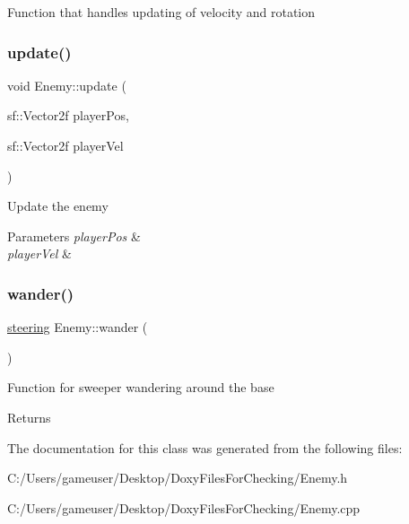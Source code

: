 Function that handles updating of velocity and rotation 

\mbox{\label{class_enemy_a7101d7b18d9f9f50dbcf3ced525ec7f4}} 
\subsubsection{\texorpdfstring{update()}{update()}}
{\footnotesize\ttfamily void Enemy\+::update (\begin{DoxyParamCaption}\item[{sf\+::\+Vector2f}]{player\+Pos,  }\item[{sf\+::\+Vector2f}]{player\+Vel }\end{DoxyParamCaption})}



Update the enemy 


\begin{DoxyParams}{Parameters}
{\em player\+Pos} & \\
\hline
{\em player\+Vel} & \\
\hline
\end{DoxyParams}
\mbox{\label{class_enemy_a1b465f7bfba7a4aeb0f5be904dfba900}} 
\subsubsection{\texorpdfstring{wander()}{wander()}}
{\footnotesize\ttfamily \mbox{\hyperlink{structsteering}{steering}} Enemy\+::wander (\begin{DoxyParamCaption}{ }\end{DoxyParamCaption})}



Function for sweeper wandering around the base 

\begin{DoxyReturn}{Returns}

\end{DoxyReturn}


The documentation for this class was generated from the following files\+:\begin{DoxyCompactItemize}
\item 
C\+:/\+Users/gameuser/\+Desktop/\+Doxy\+Files\+For\+Checking/Enemy.\+h\item 
C\+:/\+Users/gameuser/\+Desktop/\+Doxy\+Files\+For\+Checking/Enemy.\+cpp\end{DoxyCompactItemize}
